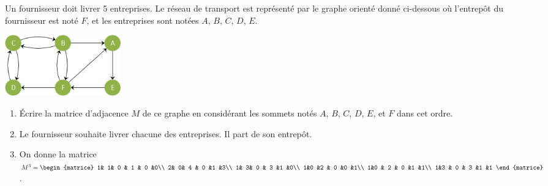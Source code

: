 \begin{exercice}
    Un fournisseur doit livrer 5 entreprises. Le réseau de transport est représenté par le graphe orienté
    donné ci-dessous où l'entrepôt du fournisseur est noté $F$, et les entreprises sont notées $A$, $B$, $C$, $D$, $E$.
    
    \begin{center}
        \includegraphics[width=5cm]{graphes/img/g2.png}
    \end{center}
    
    \begin{enumerate}
        \item Écrire la matrice d'adjacence $M$ de ce graphe en considérant les sommets notés $A$, $B$, $C$, $D$, $E$, et $F$ dans cet ordre.
        \item  Le fournisseur souhaite livrer chacune des entreprises. Il part de son entrepôt.
        \item  On donne la matrice $M^3 = \begin{matrice}
                      1& 1& 0	& 1	& 0	&0\\
                      2& 0& 4 & 0	&1	&3\\
                      1& 3& 0 & 3	&1	&0\\
                      1&0	&2	& 0	&0	&1\\
                      1&0	& 2	& 0	&1	&1\\
                      1&3	& 0	& 3	&1	&1 \end{matrice}$.
\end{enumerate}
\end{exercice}
